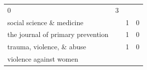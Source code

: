 \documentclass[]{tufte-handout}
\begin{document}
\begin{longtable}[]{@{}llll@{}}
\begin{minipage}[t]{0.06\columnwidth}
0\strut
\end{minipage} & \begin{minipage}[t]{0.06\columnwidth}\raggedright\strut
3\strut
\end{minipage}\tabularnewline
\begin{minipage}[t]{0.63\columnwidth}\raggedright\strut
social science \& medicine\strut
\end{minipage} & \begin{minipage}[t]{0.04\columnwidth}\raggedright\strut
\strut
\end{minipage} & \begin{minipage}[t]{0.06\columnwidth}\raggedright\strut
1\strut
\end{minipage} & \begin{minipage}[t]{0.06\columnwidth}\raggedright\strut
0\strut
\end{minipage}\tabularnewline
\begin{minipage}[t]{0.63\columnwidth}\raggedright\strut
the journal of primary prevention\strut
\end{minipage} & \begin{minipage}[t]{0.04\columnwidth}\raggedright\strut
\strut
\end{minipage} & \begin{minipage}[t]{0.06\columnwidth}\raggedright\strut
1\strut
\end{minipage} & \begin{minipage}[t]{0.06\columnwidth}\raggedright\strut
0\strut
\end{minipage}\tabularnewline
\begin{minipage}[t]{0.63\columnwidth}\raggedright\strut
trauma, violence, \& abuse\strut
\end{minipage} & \begin{minipage}[t]{0.04\columnwidth}\raggedright\strut
\strut
\end{minipage} & \begin{minipage}[t]{0.06\columnwidth}\raggedright\strut
1\strut
\end{minipage} & \begin{minipage}[t]{0.06\columnwidth}\raggedright\strut
0\strut
\end{minipage}\tabularnewline
\begin{minipage}[t]{0.63\columnwidth}\raggedright\strut
violence against women\strut
\end{minipage} & \begin{minipage}[t]{0.04\columnwidth}\raggedright\strut
\strut
\end{minipage} & \begin{minipage}[t]{0.06\columnwidth}\raggedright\strut

\end{minipage}
\end{longtable}
\end{document}
